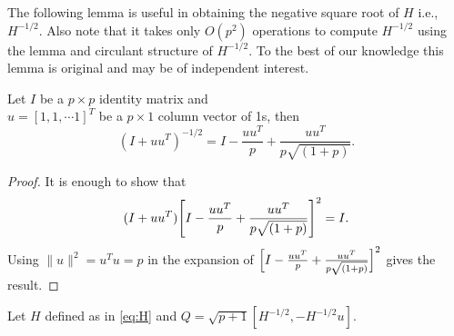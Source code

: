 The following lemma is useful in obtaining the negative square root of $H$ i.e., 
$H^{-1/2}$. Also note that it takes only $O(p^2)$ operations to compute $H^{-1/2}$
using the lemma and circulant structure of $H^{-1/2}$. To the best of our knowledge this
lemma is original and may be of independent interest.
\begin{lemma}
 \label{lemma: gen Sherman-Morisson}
Let $I$ be a $p \times p$ identity matrix and \\
$u=[1,1, \cdots 1]^{T}$
be a $p \times 1$ column vector of 1s, then
$$ (I+uu^T)^{-1/2}= I-\frac{uu^T}{p}+\frac{uu^T}{p\sqrt{(1+p)}}.$$
\end{lemma}
\begin{proof}
It is enough to show that
$$(I+uu^T)\Bigg{[}I-\frac{uu^T}{p}+\frac{uu^T}{p\sqrt{(1+p)}}\Bigg{]}^2=I.$$
Using $\|u\|^2=u^Tu=p$ in the expansion of $\Big{[}I-\frac{uu^T}{p}+\frac{uu^T}{p\sqrt{(1+p)}}\Big{]}^2$
gives the result.
\end{proof}
Let $H$ defined as in \eqref{eq:H} and $Q=\sqrt{p+1}[H^{-1/2},-H^{-1/2}u].$
